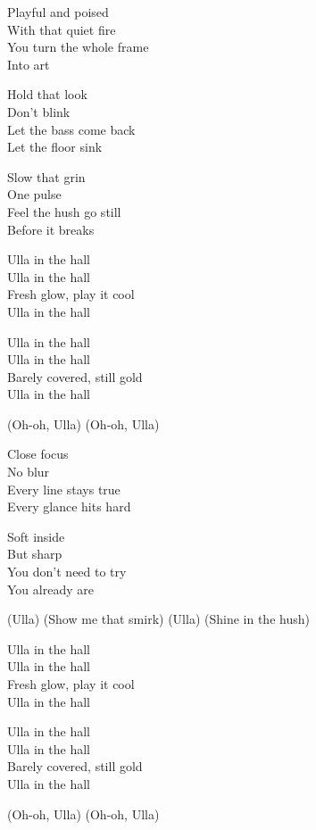\begin{lyrics}
Playful and poised\\
With that quiet fire\\
You turn the whole frame\\
Into art

Hold that look\\
Don’t blink\\
Let the bass come back\\
Let the floor sink

Slow that grin\\
One pulse\\
Feel the hush go still\\
Before it breaks

Ulla in the hall\\
Ulla in the hall\\
Fresh glow, play it cool\\
Ulla in the hall

Ulla in the hall\\
Ulla in the hall\\
Barely covered, still gold\\
Ulla in the hall

(Oh-oh, Ulla)
(Oh-oh, Ulla)

Close focus\\
No blur\\
Every line stays true\\
Every glance hits hard

Soft inside\\
But sharp\\
You don’t need to try\\
You already are

(Ulla)
(Show me that smirk)
(Ulla)
(Shine in the hush)

Ulla in the hall\\
Ulla in the hall\\
Fresh glow, play it cool\\
Ulla in the hall

Ulla in the hall\\
Ulla in the hall\\
Barely covered, still gold\\
Ulla in the hall

(Oh-oh, Ulla)
(Oh-oh, Ulla)
\end{lyrics}

